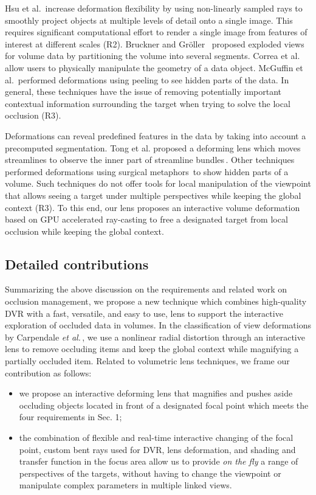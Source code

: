 Hsu et al.\,\cite{Hsu:2011:RFM:2070781.2024165} increase deformation flexibility by using non-linearly sampled rays to smoothly project objects at multiple levels of detail onto a single image. This requires significant computational effort to render a single image from features of interest at different scales (R2). Bruckner and Gr{\"o}ller~\cite{4015467} proposed exploded views for volume data by partitioning the volume into several segments. Correa et al.\,\cite{Correa:2007:IDD:1313046.1313163} allow users to physically manipulate the geometry of a data object. McGuffin et al.\,\cite{1250400} performed deformations using peeling to see hidden parts of the data. In general, these techniques have the issue of removing potentially important contextual information surrounding the target when trying to solve the local occlusion (R3).

Deformations can reveal predefined features in the data by taking into account a precomputed segmentation. Tong et al. proposed a deforming lens which moves streamlines to observe the inner part of streamline bundles\,\cite{7332955}. Other techniques performed deformations using surgical metaphors\,\cite{4069230,Correa:2006:FAV:1187627.1187827} to show hidden parts of a volume. Such techniques do not offer tools for local manipulation of the viewpoint that allows seeing a target under multiple perspectives while keeping the global context (R3). To this end, our lens proposes an interactive volume deformation based on GPU accelerated ray-casting to free a designated target from local occlusion while keeping the global context.

\vspace{-0.15cm}
\subsection{Detailed contributions}
%
Summarizing the above discussion on the requirements and related work on occlusion management, we propose a new technique which combines high-quality DVR with a fast, versatile, and easy to use, lens to support the interactive exploration of occluded data in volumes. In the classification of view deformations by Carpendale \emph{et al.}\,\cite{595268}, we use a nonlinear radial distortion through an interactive lens to remove occluding items and keep the global context while magnifying a partially occluded item. Related to volumetric lens techniques, we frame our contribution as follows:
 
\begin{itemize}
\item  we propose an interactive deforming lens that magnifies and pushes aside occluding objects located in front of a designated focal point which meets the four requirements in Sec. 1;
\item the combination of flexible and real-time interactive changing of the focal point, custom bent rays used for DVR, lens deformation, and shading and transfer function in the focus area allow us to provide \emph{on the fly} a range of perspectives of the targets, without having to change the viewpoint or manipulate complex parameters in multiple linked views.
\end{itemize}


